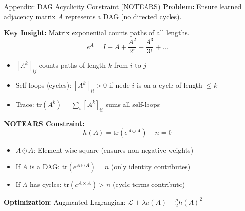 \documentclass[aspectratio=169]{beamer}
\begin{document}
\begin{frame}{Appendix: DAG Acyclicity Constraint (NOTEARS)}
\textbf{Problem:} Ensure learned adjacency matrix $A$ represents a DAG (no directed cycles).

\vspace{0.2cm}
\textbf{Key Insight:} Matrix exponential counts paths of all lengths.
\begin{equation*}
e^A = I + A + \frac{A^2}{2!} + \frac{A^3}{3!} + \ldots
\end{equation*}

\begin{itemize}
    \item $[A^k]_{ij}$ counts paths of length $k$ from $i$ to $j$
    \item Self-loops (cycles): $[A^k]_{ii} > 0$ if node $i$ is on a cycle of length $\leq k$
    \item Trace: $\text{tr}(A^k) = \sum_i [A^k]_{ii}$ sums all self-loops
\end{itemize}

\vspace{0.2cm}
\textbf{NOTEARS Constraint:}
\begin{equation*}
h(A) = \text{tr}(e^{A \odot A}) - n = 0
\end{equation*}

\begin{itemize}
    \item $A \odot A$: Element-wise square (ensures non-negative weights)
    \item If $A$ is a DAG: $\text{tr}(e^{A \odot A}) = n$ (only identity contributes)
    \item If $A$ has cycles: $\text{tr}(e^{A \odot A}) > n$ (cycle terms contribute)
\end{itemize}

\textbf{Optimization:} Augmented Lagrangian: $\mathcal{L} + \lambda h(A) + \frac{\rho}{2}h(A)^2$
\end{frame}
\end{document}
